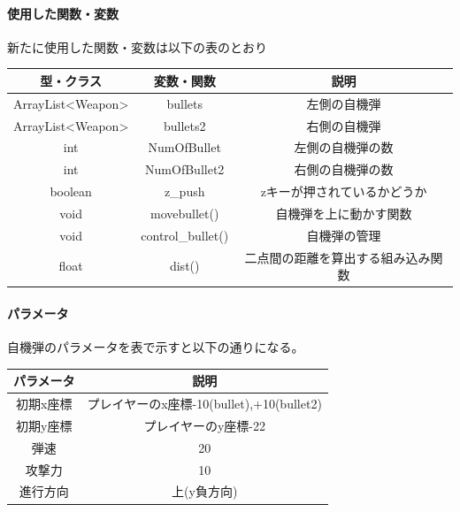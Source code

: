\documentclass[a4paper,titlepage,11pt]{ltjsarticle}
\begin{document}
\paragraph{使用した関数・変数}
新たに使用した関数・変数は以下の表のとおり
\begin{table}[H]
	\begin{center}
		\begin{tabular}{|c|c|c|}
			\hline 
		 型・クラス & 変数・関数 & 説明\\ \hline \hline
		 ArrayList<Weapon> & bullets & 左側の自機弾 \\ \hline
		 ArrayList<Weapon> & bullets2 & 右側の自機弾 \\ \hline
		 int & NumOfBullet & 左側の自機弾の数 \\ \hline
		 int & NumOfBullet2 & 右側の自機弾の数 \\ \hline
		 boolean & z\_push & zキーが押されているかどうか \\ \hline
		 void & movebullet() & 自機弾を上に動かす関数 \\ \hline
		 void & control\_bullet() & 自機弾の管理 \\ \hline
		 float & dist() & 二点間の距離を算出する組み込み関数 \\ \hline 
		\end{tabular}
	\end{center}
\end{table}

\paragraph{パラメータ}
自機弾のパラメータを表で示すと以下の通りになる。
\begin{table}[H]
\centering
\begin{tabular}{|c|c|}
	\hline
	パラメータ & 説明 \\\hline \hline
	初期x座標 & プレイヤーのx座標-10(bullet),+10(bullet2) \\ \hline
	初期y座標 & プレイヤーのy座標-22 \\ \hline
	弾速 & 20 \\ \hline 
	攻撃力 & 10 \\ \hline
	進行方向 & 上(y負方向) \\ \hline
\end{tabular}
\end{table}
\end{document}

